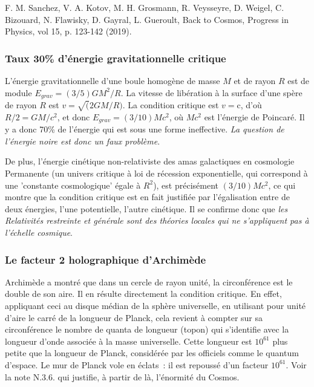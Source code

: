 \documentclass[a4paper,12pt]{article}
\begin{document}
F. M. Sanchez, V. A. Kotov,  M. H. Grosmann, R. Veysseyre, D. Weigel, C. Bizouard, N. Flawisky, D. Gayral, L. Gueroult, Back to Cosmos, Progress in Physics, vol 15, p. 123-142 (2019). 



\subsubsection{Taux 30\% d'énergie gravitationnelle critique  }

L'énergie gravitationnelle d'une boule homogène de masse $M$ et de rayon $R$ est de module $E_{grav} = (3/5)GM^2/R$. La vitesse de libération à la surface d’une spère de rayon $R$ est $v =\sqrt(2GM/R)$. La condition critique est $v = $c, d'où  $R/2 = GM/c^2$, et donc $E_{grav} = (3/10) Mc^2$, où $Mc^2$ est l'énergie de Poincaré. Il y a donc 70\% de l'énergie qui est sous une forme ineffective. \textit{La question de l’énergie noire est donc un faux problème}.


De plus, l'énergie cinétique non-relativiste des amas galactiques en cosmologie Permanente (un univers critique à loi de récession exponentielle, qui correspond à une 'constante cosmologique' égale à $R^2$), est précisément $(3/10) Mc^2$, ce qui montre que la condition critique est en fait justifiée par l'égalisation entre de deux énergies, l'une potentielle, l'autre cinétique. Il se confirme donc que \textit{les Relativités restreinte et générale sont des théories locales qui ne s'appliquent pas à l'échelle cosmique}.


\subsubsection{Le facteur 2 holographique d'Archimède}

Archimède a montré que dans un cercle de rayon unité, la circonférence est le double de son aire. Il en résulte directement la condition critique. En effet, appliquant ceci au disque médian de la sphère universelle, en utilisant pour unité d’aire le carré de la longueur de Planck, cela revient à compter sur sa circonférence le nombre de quanta de longueur (topon) qui s’identifie avec la longueur d’onde associée à la masse universelle. Cette longueur est $10^{61}$ plus petite que la longueur de Planck, considérée par les officiels comme le quantum d’espace. Le mur de Planck vole en éclats : il est repoussé d’un facteur $10^{61}$. Voir la note N.3.6. qui justifie, à partir de là, l’énormité du Cosmos. 
\end{document}
